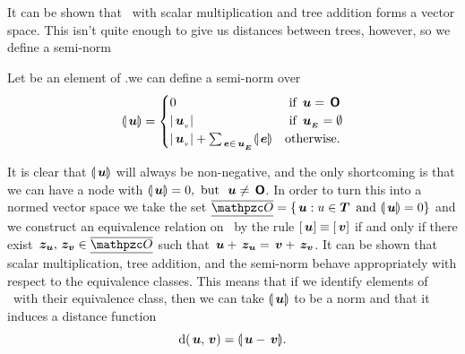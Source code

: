 
It can be shown that \TDOM\ with scalar multiplication and tree addition forms a vector space. This
isn't quite enough to give us distances between trees, however, so we define a semi-norm
\begin{definition}\label{defnabs}
  Let  be an element of \TDOM.\@Then we can define a semi-norm over \TDOM
  \begin{align*}
    \llparenthesis{\,\boldsymbol{u}}\rrparenthesis = \begin{cases}
      0 & \text{ if } \,\boldsymbol{u} = \,\boldsymbol{\mathsf{O}} \\
      \lvert{{\,\boldsymbol{u}}_{{}_{v}}}\rvert & \text{ if }{\,\boldsymbol{u}}_{{}_{\boldsymbol{E}}} = \emptyset \\
      \lvert{{\,\boldsymbol{u}}_{{}_{v}}}\rvert + \sum_{\,\boldsymbol{e}\in{\,\boldsymbol{u}}_{{}_{\boldsymbol{E}}}}\llparenthesis{\,\boldsymbol{e}}\rrparenthesis & \text{otherwise.}
    \end{cases}
  \end{align*}
\end{definition}


It is clear that $\llparenthesis{\,\boldsymbol{u}}\rrparenthesis$ will always be non-negative, and the only shortcoming is that we
can have a node  with $\llparenthesis{\,\boldsymbol{u}}\rrparenthesis = 0, \operatorname{\text{~but~}} \,\boldsymbol{u} \neq \,\boldsymbol{\mathsf{O}}$.  In order to turn
this into a normed vector space we take the set $\nullspace = \{\node{u}: u \in \DOM \mand
  \nabs{\node{u}} = 0\}$ and we construct an equivalence relation on \TDOM\ by the rule $[\,\boldsymbol{u}]
\equiv [\,\boldsymbol{v}]$ if and only if there exist $\node{z_u}, \node{z_v} \in \nullspace$ such that
$\,\boldsymbol{u} + \,\boldsymbol{z_u} = \,\boldsymbol{v} + \,\boldsymbol{z_v}$.  It can be shown that scalar multiplication,
tree addition,  and the semi-norm behave appropriately with
respect to the equivalence classes. This means that if we identify
elements of \TDOM\ with their equivalence class, then we can take $\llparenthesis{\,\boldsymbol{u}}\rrparenthesis$ to be a norm and
that it induces a distance function \[\operatorname{d}(\,\boldsymbol{u},\,\boldsymbol{v}) = \llparenthesis{\,\boldsymbol{u} - \,\boldsymbol{v}}\rrparenthesis.\]


